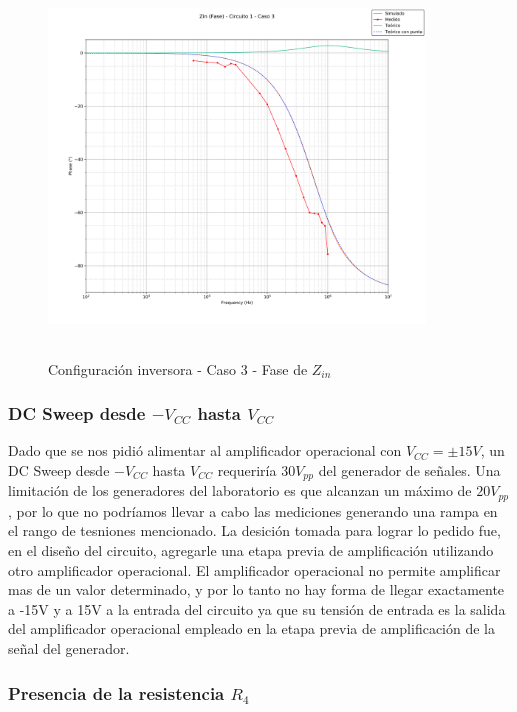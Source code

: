 \begin{figure}[H] %
	\centering
	\includegraphics[width=10cm,height=10cm,keepaspectratio]{../EJ1/00GRAFICOS/c1c3/c1c3zinFASE.png}
	\caption{Configuración inversora - Caso 3 - Fase de $Z_{in}$}
	\label{c1c3zinP}
\end{figure}

\subsubsection{DC Sweep desde $-V_{CC}$ hasta $V_{CC}$}
Dado que se nos pidi\'o alimentar al amplificador operacional con $V_{CC} = \pm 15V$, un DC Sweep desde $-V_{CC}$ hasta $V_{CC}$ requerir\'ia $30V_{pp}$ del generador de se\~nales. Una limitaci\'on de los generadores del laboratorio es que alcanzan un m\'aximo de $20V_{pp}$, por lo que no podr\'iamos llevar a cabo las mediciones generando una rampa en el rango de tesniones mencionado. La desici\'on tomada para lograr lo pedido fue, en el dise\~no del circuito, agregarle una etapa previa de amplificaci\'on utilizando otro amplificador operacional. 
El amplificador operacional no permite amplificar mas de un valor determinado, y por lo tanto no hay forma de llegar exactamente a -15V y a 15V a la entrada del circuito ya que su tensi\'on de entrada es la salida del amplificador operacional empleado en la etapa previa de amplificaci\'on de la se\~nal del generador.

\subsubsection{Presencia de la resistencia $R_4$}

